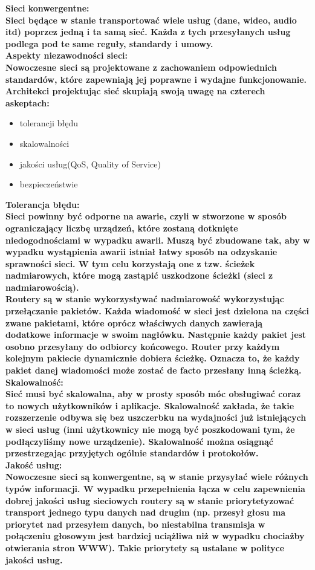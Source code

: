 \documentclass[a4paper,12pt]{article}
\newcommand{\h}[1]{\noindent \bf #1 \rm \\ \noindent}
\begin{document}
\h{Sieci konwergentne:}
Sieci będące w stanie transportować wiele usług (dane, wideo, audio itd) poprzez jedną i ta samą sieć. Każda z tych przesyłanych usług podlega pod te same reguły, standardy i umowy. \\

\h{Aspekty niezawodności sieci:}
Nowoczesne sieci są projektowane z zachowaniem odpowiednich standardów, które zapewniają jej poprawne i wydajne funkcjonowanie. Architekci projektując sieć skupiają swoją uwagę na czterech askeptach:
\begin{itemize}
	\item tolerancji błędu
	\item skalowalności
	\item jakości usług(QoS, Quality of Service)
	\item bezpieczeństwie
\end{itemize}
\vspace{5mm}

\h{Tolerancja błędu:}
Sieci powinny być odporne na awarie, czyli w stworzone w sposób ograniczający liczbę urządzeń, które zostaną dotknięte niedogodnościami w wypadku awarii. Muszą być zbudowane tak, aby w wypadku wystąpienia awarii istniał łatwy sposób na odzyskanie sprawności sieci. W tym celu korzystają one z tzw. ścieżek nadmiarowych, które mogą zastąpić uszkodzone ścieżki (sieci z nadmiarowością).\\

\noindent
Routery są w stanie wykorzystywać nadmiarowość wykorzystując przełączanie pakietów. Każda wiadomość w sieci jest dzielona na części zwane pakietami, które oprócz właściwych danych zawierają dodatkowe informacje w swoim nagłówku. Następnie każdy pakiet jest osobno przesyłany do odbiorcy końcowego. Router przy każdym kolejnym pakiecie dynamicznie dobiera ścieżkę. Oznacza to, że każdy pakiet danej wiadomości może zostać de facto przesłany inną ścieżką.\\

\h{Skalowalność:}
Sieć musi być skalowalna, aby w prosty sposób móc obsługiwać coraz to nowych użytkowników i aplikacje. Skalowalność zakłada, że takie rozszerzenie odbywa się bez uszczerbku na wydajności już istniejących w sieci usług (inni użytkownicy nie mogą być poszkodowani tym, że podłączyliśmy nowe urządzenie). Skalowalność można osiągnąć przestrzegając przyjętych ogólnie standardów i protokołów.\\

\h{Jakość usług:}
Nowoczesne sieci są konwergentne, są w stanie przysyłać wiele różnych typów informacji. W wypadku przepełnienia łącza w celu zapewnienia dobrej jakości usług sieciowych routery są w stanie priorytetyzować transport jednego typu danych nad drugim (np. przesył głosu ma priorytet nad przesyłem danych, bo niestabilna transmisja w połączeniu głosowym jest bardziej uciążliwa niż w wypadku chociażby otwierania stron WWW). Takie priorytety są ustalane w polityce jakości usług.\\
\end{document}

